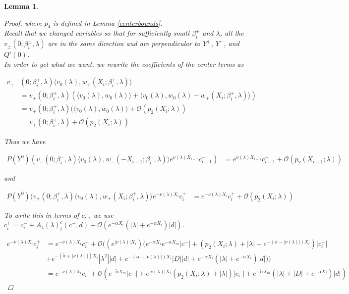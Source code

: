 \documentclass[12pt]{article}
\newtheorem{lemma}{Lemma}
\begin{document}
\begin{lemma}
\begin{proof}
where $p_4$ is defined in Lemma \ref{centerbounds}.\\

Recall that we changed variables so that for sufficiently small $\beta_i^\pm$ and $\lambda$, all the $v_\pm(0; \beta_i^\pm, \lambda)$ are in the same direction and are perpendicular to $Y^+$, $Y^-$, and $Q'(0)$.\\

In order to get what we want, we rewrite the coefficients of the center terms as

\begin{align*}
v_+&(0; \beta_i^+, \lambda) \langle v_0(\lambda), w_+(X_i; \beta_i^+, \lambda) \rangle \\
&= v_+(0; \beta_i^+, \lambda) ( \langle v_0(\lambda), w_0(\lambda) \rangle + \langle v_0(\lambda), w_0(\lambda) - w_+(X_i; \beta_i^+, \lambda) \rangle) \\
&= v_+(0; \beta_i^+, \lambda) ( \langle v_0(\lambda), w_0(\lambda) \rangle + \mathcal{O}(p_2(X_i; \lambda)) \\
&= v_+(0; \beta_i^+, \lambda) + \mathcal{O}(p_2(X_i; \lambda))
\end{align*}

Thus we have

\begin{align*}
P(Y^0) ( v_-(0; \beta_i^-, \lambda) \langle v_0(\lambda), w_-(-X_{i-1}; \beta_i^-, \lambda) \rangle e^{\nu(\lambda)X_{i-1}} c_{i-1}^-) &= e^{\nu(\lambda)X_{i-1}} c_{i-1}^- + \mathcal{O}(p_2(X_{i-1}; \lambda))
\end{align*}

and

\begin{align*}
P(Y^0) ( v_+(0; \beta_i^+, \lambda) \langle v_0(\lambda), w_+(X_i; \beta_i^+, \lambda) \rangle e^{-\nu(\lambda)X_i} c_i^+ &= e^{-\nu(\lambda)X_i} c_i^+ + \mathcal{O}(p_2(X_i; \lambda))
\end{align*}

To write this in terms of $c_i^-$, we use $c_i^+ = c_i^- + A_4(\lambda)_i^c(c^-, d) + \mathcal{O}( e^{-\alpha X_i} (|\lambda| +  e^{-\alpha X_i} ) |d| )$.

\begin{align*}
e^{-\nu(\lambda)X_i} c_i^+ &= e^{-\nu(\lambda)X_i} c_i^- + \mathcal{O}((e^{|\nu(\lambda)|X_i})( e^{-\alpha X_i} e^{-\alpha X_m}|c^-| + (p_2(X_i; \lambda) + |\lambda| + e^{-(\alpha - |\nu(\lambda)|)X_i})|c_i^-| \\
&+ e^{-(\tilde{\alpha} + |\nu(\lambda)|) X_i} |\lambda^2| |d| + e^{-(\alpha - |\nu(\lambda)|) X_i}|D||d| +  e^{-\alpha X_i} (|\lambda| +  e^{-\alpha X_i} ) |d| )) \\
&= e^{-\nu(\lambda)X_i} c_i^- + \mathcal{O}(e^{-\tilde{\alpha} X_m}|c^-| + e^{|\nu(\lambda)|X_i}(p_2(X_i; \lambda) + |\lambda|)|c_i^-| 
+ e^{-\tilde{\alpha} X_m}( |\lambda| + |D| + e^{-\alpha X_i} ) |d| )
\end{align*}


\end{proof}
\end{lemma}
\end{document}
